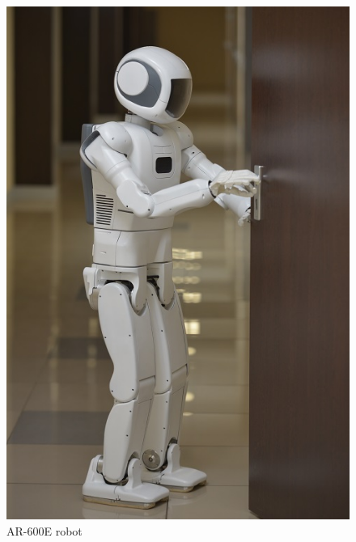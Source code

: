 \documentclass[letterpaper, 10 pt, conference]{ieeeconf}  %
\begin{document}
\begin{figure} [thpb]
      \centering

      \includegraphics[scale=1]{ar600e}
      \caption{AR-600E robot}
      \label{img:ar600e}
\end{figure}

\addtolength{\textheight}{-12cm}   %
\end{document}
